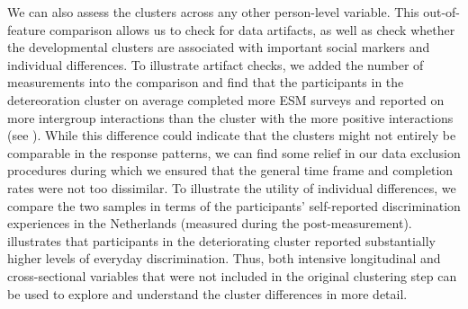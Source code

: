 \Question{\textcolor{cyan}{Talk about early warning signals here? E.g., divergences in means over time could be invesitigated with targeted studies.}}

We can also assess the clusters across any other person-level variable.
This out-of-feature comparison allows us to check for data artifacts, as
well as check whether the developmental clusters are associated with
important social markers and individual differences. To illustrate
artifact checks, we added the number of measurements into the comparison
and find that the participants in the detereoration cluster on average
completed more ESM surveys and reported on more intergroup interactions
than the cluster with the more positive interactions (see
). While this difference could indicate that
the clusters might not entirely be comparable in the response patterns,
we can find some relief in our data exclusion procedures during which we
ensured that the general time frame and completion rates were not too
dissimilar. To illustrate the utility of individual differences, we
compare the two samples in terms of the participants' self-reported
discrimination experiences in the Netherlands (measured during the
post-measurement).  illustrates that
participants in the deteriorating cluster reported substantially higher
levels of everyday discrimination. Thus, both intensive longitudinal and
cross-sectional variables that were not included in the original
clustering step can be used to explore and understand the cluster
differences in more detail.
